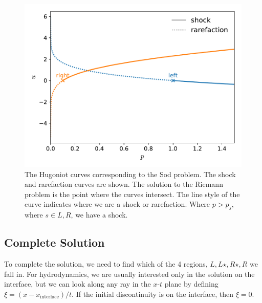 \begin{figure}[t]
\centering
\includegraphics[width=0.9\linewidth]{riemann-phase}
\caption[The Hugoniot curves corresponding
to the Sod problem]{\label{fig:euler:riemann-curve} The Hugoniot
curves corresponding to the Sod problem.  The shock and rarefaction
curves are shown.  The solution to the Riemann problem is the point
where the curves intersect.  The line style of the curve indicates
where we are a shock or rarefaction.  Where $p > p_s$, where $s \in {L,R}$, we have a shock.\\
}
\end{figure}


\subsection{Complete Solution}

To complete the solution, we need to find which of the 4 regions, $L,
L\star, R\star, R$ we fall in.  For hydrodynamics, we are usually
interested only in the solution on the interface, but we can look
along any ray in the $x$-$t$ plane by defining $\xi = (x -
x_\mathrm{interface})/t$.  If the initial discontinuity is on the
interface, then $\xi = 0$.

